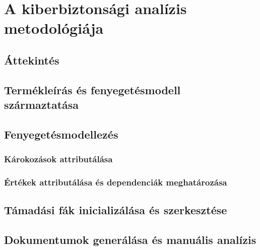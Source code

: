\chapter{A kiberbiztonsági analízis metodológiája}

\section{Áttekintés}

\section{Termékleírás és fenyegetésmodell származtatása}

\section{Fenyegetésmodellezés}

\subsection{Károkozások attributálása}

\subsection{Értékek attributálása és dependenciák meghatározása}

\section{Támadási fák inicializálása és szerkesztése}

\section{Dokumentumok generálása és manuális analízis}